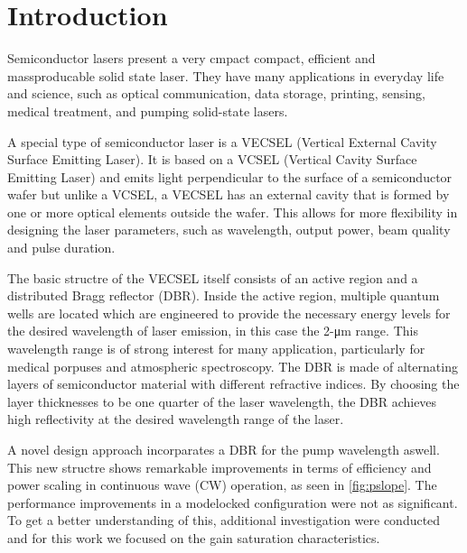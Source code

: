 \chapter{Introduction}\label{chapter:introduction}

Semiconductor lasers present a very cmpact compact, efficient and massproducable solid state laser. They have many applications in everyday life and science, such as optical communication, data storage, printing, sensing, medical treatment, and pumping solid-state lasers.

A special type of semiconductor laser is a VECSEL (Vertical External Cavity Surface Emitting Laser). It is based on a VCSEL (Vertical Cavity Surface Emitting Laser) and emits light perpendicular to the surface of a semiconductor wafer but unlike a VCSEL,  a VECSEL has an external cavity that is formed by one or more optical elements outside the wafer. This allows for more flexibility in designing the laser parameters, such as wavelength, output power, beam quality and pulse duration.

The basic structre of the VECSEL itself consists of an active region and a distributed Bragg reflector (DBR). Inside the active region, multiple quantum wells are located which are engineered to provide the necessary energy levels for the desired wavelength of laser emission, in this case the 2-\unit{\um} range. This wavelength range is of strong interest for many application, particularly for medical porpuses and atmospheric spectroscopy. The DBR is made of alternating layers of semiconductor material with different refractive indices. By choosing the layer thicknesses to be one quarter of the laser wavelength, the DBR achieves high reflectivity at the desired wavelength range of the laser. 

A novel design approach incorparates a DBR for the pump wavelength aswell. This new structre shows remarkable improvements in terms of efficiency and power scaling in continuous wave (CW) operation, as seen in \cref{fig:pslope}. The performance improvements in a modelocked configuration were not as significant. To get a better understanding of this, additional investigation were conducted and for this work we focused on the gain saturation characteristics.

